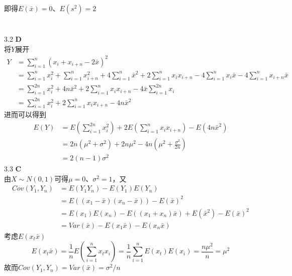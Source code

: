 \documentclass[a4paper]{ctexart}    %
\begin{document}
	即得$E(\bar{x})=0$、$E(s^2)=2$\\
	\\
	\\
	3.2 \quad \textbf{D} \\
	将$Y$展开
	\begin{equation*}
		\begin{split}
			Y &= \sum\limits_{i=1}^{n}\left(x_i + x_{i+n} - 2\bar{x}\right)^2 \\
			&= \sum\limits_{i=1}^{n}x_i^2 + \sum\limits_{i=1}^{n}x_{i+n}^2 + 4\sum\limits_{i=1}^{n}\bar{x}^2 + 2\sum\limits_{i=1}^{n}x_ix_{i+n} - 4\sum\limits_{i=1}^{n}x_i\bar{x} - 4\sum\limits_{i=1}^{n}x_{i+n}\bar{x} \\
			&= \sum\limits_{i=1}^{2n} x_i^2 + 4n\bar{x}^2 + 2\sum\limits_{i=1}^{n}x_ix_{i+n} -4\bar{x}\sum\limits_{i=1}^{2n}x_i \\
			&=\sum\limits_{i=1}^{2n}x_i^2 + 2\sum\limits_{i=1}^{n}x_ix_{i+n} - 4n\bar{x}^2 			
		\end{split}
	\end{equation*}
	进而可以得到
	\begin{equation*}
		\begin{split}
			E(Y) &= E\left(\sum\limits_{i=1}^{2n}x_i^2\right) + 2E\left(\sum\limits_{i=1}^{n}x_ix_{i+n}\right) - E(4n\bar{x}^2) \\
			&= 2n(\mu^2 + \sigma^2) + 2n\mu^2 - 4n(\mu^2 + \frac{\sigma^2}{2n}) \\
			&= 2(n-1)\sigma^2
		\end{split}
	\end{equation*}
	3.3 \quad \textbf{C} \\
	由$X \sim N(0, 1)$可得$\mu=0$、$\sigma^2=1$，又
	\begin{equation*}
		\begin{split}
			Cov(Y_1, Y_n) &= E(Y_1Y_n)-E(Y_1)E(Y_n) \\
			&= E\left((x_1-\bar{x})(x_n-\bar{x})\right) - E(\bar{x})^2 \\
			&= E(x_1)E(x_n) - E((x_1+x_n)\bar{x}) + E(\bar{x}^2) - E(\bar{x})^2 \\
			& = Var(\bar{x}) - E(x_1\bar{x}) - E(x_n\bar{x})
		\end{split}
	\end{equation*}
	考虑$E(x_t\bar{x})$
	\begin{equation*}
		E(x_t\bar{x}) = \frac{1}{n}E\left(\sum\limits_{i=1}^{n}x_tx_i\right) = \frac{1}{n}\sum\limits_{i=1}^{n}E(x_t)E(x_i) = \frac{n\mu^2}{n} = \mu^2\tag{*}
	\end{equation*}
	故而$Cov(Y_1, Y_n) = Var(\bar{x}) = \sigma^2/n$ \\
\end{document}
